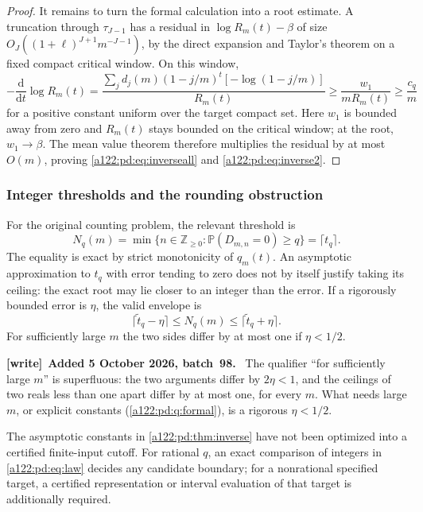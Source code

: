 \documentclass[11pt,letterpaper]{article}
\newenvironment{writenote}[1][]{\par\smallskip\begingroup\small
 \noindent\textbf{[write]}\if\relax\detokenize{#1}\relax\else~\textbf{#1.}\fi\ }%
 {\par\endgroup\smallskip}
\numberwithin{equation}{subsection}
\theoremstyle{definition}
\theoremstyle{remark}
\theoremstyle{plain}
\newcommand{\Prob}{\mathbb P}
\begin{document}
\begin{proof}
It remains to turn the formal calculation into a root estimate. A
truncation through $\tau_{J-1}$ has a residual in $\log R_m(t)-\beta$
of size $O_J((1+\ell)^{J+1}m^{-J-1})$, by the direct expansion and
Taylor's theorem on a fixed compact critical window. On this window,
\[
 -\frac{\mathrm d}{\mathrm dt}\log R_m(t)
 =\frac{\sum_j d_j(m)(1-j/m)^t[-\log(1-j/m)]}{R_m(t)}
 \ge\frac{w_1}{mR_m(t)}\ge\frac{c_q}{m}
\]
for a positive constant uniform over the target compact set.
Here $w_1$ is bounded away from zero and $R_m(t)$ stays bounded
on the critical window; at the root, $w_1\to\beta$.
The mean value theorem therefore multiplies the residual by at most
$O(m)$, proving \eqref{a122:pd:eq:inverseall} and \eqref{a122:pd:eq:inverse2}.
\end{proof}

\subsubsection{Integer thresholds and the rounding obstruction}
For the original counting problem, the relevant threshold is
\begin{equation}\label{a122:pd:eq:intthreshold}
 N_q(m)=\min\{n\in\mathbb Z_{\ge0}:\Prob(D_{m,n}=0)\ge q\}
       =\lceil t_q\rceil.
\end{equation}
The equality is exact by strict monotonicity of $q_m(t)$.
An asymptotic approximation to $t_q$ with error tending to zero does
not by itself justify taking its ceiling: the exact root may lie closer
to an integer than the error.
If a rigorously bounded error is $\eta$, the valid envelope is
\[
 \lceil \widetilde t_q-\eta\rceil\le N_q(m)
 \le\lceil\widetilde t_q+\eta\rceil.
\]
For sufficiently large $m$ the two sides differ by at most one if $\eta<1/2$.
\begin{writenote}[Added 5 October 2026, batch~98]
The qualifier ``for sufficiently large $m$'' is superfluous: the two
arguments differ by $2\eta<1$, and the ceilings of two reals less than
one apart differ by at most one, for every $m$. What needs large $m$, or
explicit constants (\cref{a122:pd:q:formal}), is a rigorous $\eta<1/2$.
\end{writenote}
The asymptotic constants in \cref{a122:pd:thm:inverse} have not been optimized
into a certified finite-input cutoff. For rational $q$, an exact
comparison of integers in \eqref{a122:pd:eq:law} decides any candidate boundary;
for a nonrational specified target, a certified representation or
interval evaluation of that target is additionally required.
\end{document}
